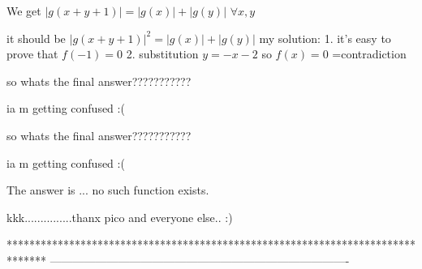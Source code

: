 \begin{solution}
	\begin{tcolorbox}We get $ |g(x + y + 1)| = |g(x)| + |g(y)|$ $ \forall x,y$ \end{tcolorbox}it should be $ |g(x + y + 1)|^2 = |g(x)| + |g(y)|$
my solution:
1. it's easy to prove that $ f(-1)=0$
2. substitution $ y=-x-2$
so $ f(x)=0$ =contradiction
\end{solution}






\begin{solution}
	so whats the final answer???????????

ia m getting confused  :(
\end{solution}



\begin{solution}
	\begin{tcolorbox}so whats the final answer???????????

ia m getting confused  :(\end{tcolorbox}

The answer is ... no such function exists.
\end{solution}



\begin{solution}
	kkk...............thanx pico and everyone else.. :)
\end{solution}
*******************************************************************************
-------------------------------------------------------------------------------

